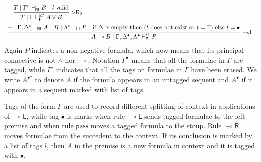 \documentclass[submission,copyright,creativecommons]{eptcs}
\theoremstyle{definition}
\newcommand{\lright}{{\multimap}\mathsf{R}}
\newcommand{\lleft}{{\multimap}\mathsf{L}}
\newcommand{\pass}{\mathsf{pass}}
\newcommand{\orrtwo}{\lor \mathsf{R}_{2}}
\newcommand{\lolli}{\multimap}
\newcommand{\RI}{\mathsf{RI}}
\newcommand{\LI}{\mathsf{LI}}
\newcommand{\F}{\mathsf{F}}
\newcommand{\tP}{\mathbb{P}}
\newcommand{\tE}{\mathbb{E}}
\begin{document}
\begin{equation*}
\begin{array}{lc}
{{    }
    \quad
    \infer[\orrtwo]{T \mid \Gamma \vdash^{\tE?}_{\F} A \lor B}{
      T \mid \Gamma^{\circ} \vdash^{l}_{\RI} B
      &
      l \ \text{valid}
    }
    }
    \\[6pt]
    \multicolumn{2}{c}{
      \infer[\lleft]{A \lolli B \mid \Gamma , \Delta^{\bullet} , \Lambda^{\bullet} \vdash^{t?}_{\F} P}{
        - \mid \Gamma , \Delta^{\circ} \vdash_{\RI} A
        &
        B \mid \Lambda^{\circ} \vdash_{\LI} P
        &
        \text{if } \Delta \text{ is empty then } (t \text{ does not exist or } t =  \Gamma)  \text{ else }  t = \bullet 
      }
    }
  \end{array}
\end{equation*}
Again $P$ indicates a non-negative formula, which now means that its principal connective is not $\land$ nor $\lolli$. Notation $\Gamma^{\bullet}$ means that all the formulae in $\Gamma$ are tagged, while $\Gamma^{\circ}$ indicates that all the tags on formulae in $\Gamma$ have been erased. We write $A^{\bullet?}$ to denote $A$ if the formula appears in an untagged sequent and $A^\bullet$ if it appears in a sequent marked with list of tags.

Tags of the form $ \Gamma$ are used to record different splitting of context in applications of $\lleft$, while tag $\bullet$ is marks when rule $\lleft$ sends tagged formulae to the left premise and when rule $\pass$ moves a tagged formula to the stoup.
Rule $\lright$  moves formulae from the succedent to the context. If its conclusion is marked by a list of tags $l$, then $A$ in the premise is a new formula in context and it is tagged with $\bullet$.
\end{document}
